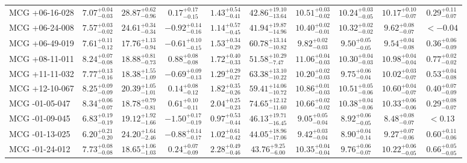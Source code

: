\documentclass[onecolumn]{mn2e}
\begin{document}
\begin{landscape}
{\begin{center}
\begin{longtable}{lccccccccc}
MCG +06-16-028 & $7.07_{-0.03}^{+0.04}$ & $28.87_{-0.96}^{+0.62}$ & $0.17_{-0.15}^{+0.17}$ & $1.43_{-0.41}^{+0.54}$ &$42.86_{-13.64}^{+19.10}$ & $10.51_{-0.02}^{+0.03}$ & $10.24_{-0.05}^{+0.03}$ & $10.17_{-0.07}^{+0.10}$ & $0.29_{-0.07}^{+0.11}$ \\
MCG +06-24-008 & $7.57_{-0.02}^{+0.03}$ & $24.61_{-0.34}^{+0.34}$ & $-0.92_{-0.16}^{+0.14}$ & $1.14_{-0.45}^{+0.57}$ &$41.94_{-14.96}^{+19.87}$ & $10.40_{-0.01}^{+0.02}$ & $10.32_{-0.02}^{+0.02}$ & $9.62_{-0.07}^{+0.08}$ & $<-0.04$ \\
MCG +06-49-019 & $7.61_{-0.12}^{+0.11}$ & $17.76_{-0.94}^{+1.13}$ & $-0.61_{-0.15}^{+0.10}$ & $1.53_{-0.29}^{+0.34}$ &$60.78_{-10.82}^{+13.14}$ & $9.82_{-0.03}^{+0.02}$ & $9.50_{-0.05}^{+0.05}$ & $9.54_{-0.08}^{+0.04}$ & $0.36_{-0.09}^{+0.06}$ \\
MCG +08-11-011 & $8.24_{-0.08}^{+0.07}$ & $18.88_{-0.73}^{+0.81}$ & $0.88_{-0.08}^{+0.08}$ & $1.72_{-0.33}^{+0.40}$ &$51.58_{-7.47}^{+10.29}$ & $11.06_{-0.03}^{+0.04}$ & $10.30_{-0.03}^{+0.04}$ & $10.98_{-0.04}^{+0.04}$ & $0.77_{-0.02}^{+0.02}$ \\
MCG +11-11-032 & $7.77_{-0.16}^{+0.13}$ & $18.38_{-1.09}^{+1.55}$ & $-0.69_{-0.13}^{+0.09}$ & $1.29_{-0.27}^{+0.29}$ &$63.38_{-10.22}^{+13.10}$ & $10.20_{-0.03}^{+0.02}$ & $9.75_{-0.04}^{+0.06}$ & $10.02_{-0.07}^{+0.03}$ & $0.53_{-0.08}^{+0.04}$ \\
MCG +12-10-067 & $8.25_{-0.09}^{+0.09}$ & $20.39_{-1.01}^{+1.05}$ & $0.14_{-0.12}^{+0.08}$ & $1.82_{-0.26}^{+0.35}$ &$59.41_{-10.72}^{+14.06}$ & $10.86_{-0.03}^{+0.01}$ & $10.51_{-0.06}^{+0.05}$ & $10.60_{-0.07}^{+0.04}$ & $0.40_{-0.09}^{+0.07}$ \\
MCG -01-05-047 & $8.34_{-0.07}^{+0.06}$ & $18.78_{-0.81}^{+0.79}$ & $0.61_{-0.11}^{+0.10}$ & $2.04_{-0.23}^{+0.25}$ &$74.65_{-11.60}^{+12.12}$ & $10.66_{-0.02}^{+0.02}$ & $10.38_{-0.06}^{+0.04}$ & $10.33_{-0.06}^{+0.06}$ & $0.29_{-0.07}^{+0.08}$ \\
MCG -01-09-045 & $6.83_{-0.19}^{+0.19}$ & $19.12_{-1.66}^{+1.92}$ & $-1.50_{-0.19}^{+0.17}$ & $0.97_{-0.44}^{+0.53}$ &$46.13_{-16.45}^{+19.71}$ & $9.05_{-0.04}^{+0.05}$ & $8.92_{-0.05}^{+0.06}$ & $8.48_{-0.07}^{+0.08}$ & $<0.13$ \\
MCG -01-13-025 & $6.20_{-0.20}^{+0.21}$ & $24.20_{-2.46}^{+1.64}$ & $-0.88_{-0.17}^{+0.14}$ & $1.02_{-0.42}^{+0.61}$ &$44.05_{-17.06}^{+18.96}$ & $9.42_{-0.04}^{+0.03}$ & $8.90_{-0.14}^{+0.04}$ & $9.27_{-0.06}^{+0.07}$ & $0.60_{-0.06}^{+0.11}$ \\
MCG -01-24-012 & $7.73_{-0.08}^{+0.08}$ & $18.65_{-1.03}^{+1.06}$ & $0.24_{-0.09}^{+0.07}$ & $2.28_{-0.46}^{+0.49}$ &$43.76_{-6.00}^{+9.25}$ & $10.35_{-0.04}^{+0.04}$ & $9.76_{-0.07}^{+0.06}$ & $10.22_{-0.05}^{+0.06}$ & $0.66_{-0.05}^{+0.05}$ \\

\end{longtable}
\end{center}}
\end{landscape}
\end{document}
